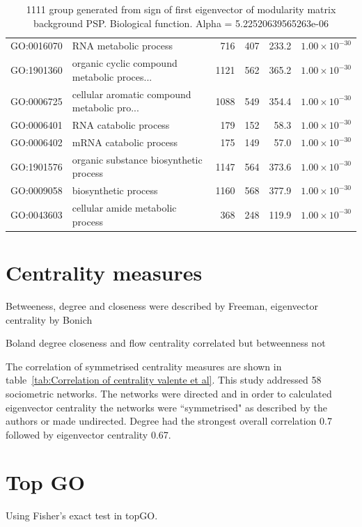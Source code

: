 \begin{table}[ht]
\begin{tabular}{llrrrr}
  GO:0016070 & RNA metabolic process & 716 & 407 & 233.2 & $1.00 \times 10^{-30}$ \\ 
  GO:1901360 & organic cyclic compound metabolic proces... & 1121 & 562 & 365.2 & $1.00 \times 10^{-30}$ \\ 
  GO:0006725 & cellular aromatic compound metabolic pro... & 1088 & 549 & 354.4 & $1.00 \times 10^{-30}$ \\ 
  GO:0006401 & RNA catabolic process & 179 & 152 & 58.3 & $1.00 \times 10^{-30}$ \\ 
  GO:0006402 & mRNA catabolic process & 175 & 149 & 57.0 & $1.00 \times 10^{-30}$ \\ 
  GO:1901576 & organic substance biosynthetic process & 1147 & 564 & 373.6 & $1.00 \times 10^{-30}$ \\ 
  GO:0009058 & biosynthetic process & 1160 & 568 & 377.9 & $1.00 \times 10^{-30}$ \\ 
  GO:0043603 & cellular amide metabolic process & 368 & 248 & 119.9 & $1.00 \times 10^{-30}$ \\ 
   \hline
\end{tabular}
\caption{1111 group generated from sign of first eigenvector of modularity matrix background PSP. Biological function. Alpha = 5.22520639565263e-06} 
\label{tab:1111 group generated from sign of first eigenvector of modularity matrix background PSP. Biological function. Alpha = 5.22520639565263e-06}
\end{table}


\section{Centrality measures}
Betweeness, degree and closeness were described by Freeman, eigenvector centrality by Bonich \cite{valente2008correlated}

Boland degree closeness and flow centrality correlated but betweenness not

The correlation of symmetrised centrality measures are shown in table~\ref{tab:Correlation of centrality valente et al}. This study addressed 58 sociometric networks. The networks were directed and in order to calculated eigenvector centrality the networks were ``symmetrised" as described by the authors or made undirected. Degree had the strongest overall correlation 0.7 followed by eigenvector centrality 0.67.

\section{Top GO}
Using Fisher's exact test in topGO.
